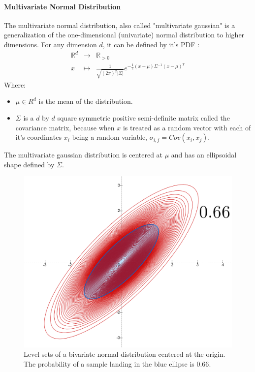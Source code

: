\documentclass[a4paper,12pt]{article}
\theoremstyle{definition}
\theoremstyle{plain}
\def\R{\mathbb{R}}%
\newcommand\fonctionnonnommee[4]{\begin{array}{ccc}
		#1 &\longrightarrow& #2\\
		#3 &\longmapsto & #4
\end{array}}%
\begin{document}
\paragraph{Multivariate Normal Distribution} The multivariate normal distribution, also called "multivariate gaussian" is a generalization of the one-dimensional (univariate) normal distribution to higher dimensions. For any dimension $d$, it can be defined by it's PDF :
$$\fonctionnonnommee{\R^{d}}{\R_{>0}}{x}{\frac{1}{\sqrt{(2\pi)^2 \lvert \Sigma \rvert}} e^{-\frac{1}{2}(x-\mu) \Sigma^{-1} (x-\mu)^{T}}}$$
Where:
\begin{itemize}
	\item $\mu \in{R^d}$ is the mean of the distribution.
	\item $\Sigma$ is a $d$ by $d$ square symmetric positive semi-definite matrix called the covariance matrix, because when $x$ is treated as a random vector with each of it's coordinates $x_i$ being a random variable, $\sigma_{i,j}= Cov(x_{i},x_{j})$.
\end{itemize}
The multivariate gaussian distribution is centered at $\mu$ and has an ellipsoidal shape defined by $\Sigma$.
\begin{figure}[H]
	\centering
	\includegraphics[width=0.4\linewidth]{figures/Binorm}
	\caption{Level sets of a bivariate normal distribution centered at the origin. The probability of a sample landing in the blue ellipse is $0.66$.}
	\label{fig:binorm}
\end{figure}
\end{document}

